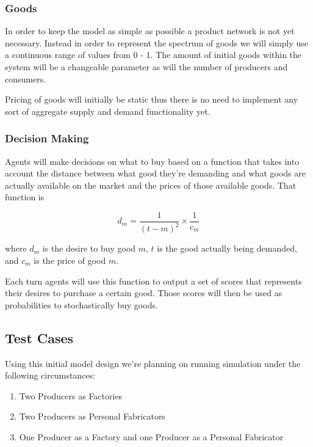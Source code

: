 \documentclass[11pt,letterpaper]{article}
\begin{document}
\subsubsection*{Goods}

In order to keep the model as simple as possible a product network is not yet necessary. Instead in order to represent the spectrum of goods we will simply use a continuous range of values from 0 - 1. The amount of initial goods within the system will be a changeable parameter as will the number of producers and consumers. 

Pricing of goods will initially be static thus there is no need to implement any sort of aggregate supply and demand functionality yet.

\subsubsection*{Decision Making}

Agents will make decisions on what to buy based on a function that takes into account the distance between what good they're demanding and what goods are actually available on the market and the prices of those available goods. That function is

\begin{equation}
d_m = \frac{1}{(t-m)^2} \times \frac{1}{c_m} 
\end{equation}

where $d_m$ is the desire to buy good $m$, $t$ is the good actually being demanded, and $c_m$ is the price of good $m$. 

Each turn agents will use this function to output a set of scores that represents their desires to purchase a certain good. Those scores will then be used as probabilities to stochastically buy goods.

\subsection*{Test Cases}

Using this initial model design we're planning on running simulation under the following circumstances:

\begin{enumerate}
\item
Two Producers as Factories
\item
Two Producers as Personal Fabricators
\item
One Producer as a Factory and one Producer as a Personal Fabricator
\end{enumerate}
\end{document}
